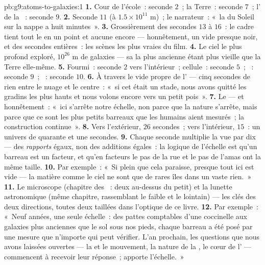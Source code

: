 \begin{solution}{pb:g9:atoms-to-galaxies:1}
\textbf{1.} Cour de l'école~: seconde $2$~; la Terre~: seconde $7$~;
l' de la ~: seconde $9$.
\textbf{2.} Seconde $11$ (à $1.5 \times 10^{11}$ \unit{m})~; le
narrateur~: «~la  du Soleil sur la nappe a huit minutes~».
\textbf{3.} Grossièrement des secondes $13$ à $16$~: le cadre tient
tout le  en un point et aucune  encore ---
honnêtement, un vide presque noir, et des secondes entières~: les
scènes les plus vraies du film.
\textbf{4.} Le ciel le plus profond exploré, $10^{26}$ \unit{m} de
galaxies --- sa  la plus ancienne étant plus vieille que la
Terre elle-même.
\textbf{5.} Fourmi~: seconde $2$ vers l'intérieur~; cellule~: seconde
$5$~; ~: seconde $9$~; ~: seconde $10$.
\textbf{6.} À travers le vide propre de l' --- cinq secondes de
rien entre le nuage et le centre~: «~si cet  était un stade, nous
avons quitté les gradins les plus hauts et nous volons encore vers un
petit pois~».
\textbf{7.} Le  --- et honnêtement~: «~ici s'arrête notre
échelle, non parce que la nature s'arrête, mais parce que ce sont les
plus petits barreaux que les humains aient mesurés~; la construction
continue~».
\textbf{8.} Vers l'extérieur, $26$ secondes~; vers l'intérieur,
$15$~: un univers de quarante et une secondes.
\textbf{9.} Chaque seconde multiplie la vue par dix --- des
\emph{rapports} égaux, non des additions égales~: la logique de
l'échelle est qu'un barreau est un facteur, et qu'en facteurs le pas
de la rue et le pas de l'amas ont la même taille.
\textbf{10.} Par exemple~: «~Si plein que cela paraisse, presque tout
ici est vide --- la matière comme le ciel ne sont que de rares îles
dans un vaste rien.~»
\textbf{11.} Le microscope (chapitre des ~: deux  au-dessus du petit) et la lunette astronomique (même
chapitre, rassemblant le faible et le lointain) --- les clés des deux
directions, toutes deux taillées dans l'optique de ce livre.
\textbf{12.} Par exemple~: «~Neuf années, une seule échelle~: des
pattes comptables d'une coccinelle aux galaxies plus anciennes que le
sol sous nos pieds, chaque barreau a été posé par une mesure que
n'importe qui peut vérifier. L'an prochain, les questions que nous
avons laissées ouvertes --- la  et le mouvement, la nature de la
, le cœur de l' --- commencent à recevoir leur réponse~;
apporte l'échelle.~»
\end{solution}
